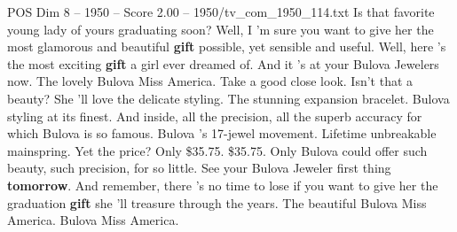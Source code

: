 \begin{textsample}{POS Dim 8 – 1950 – Score 2.00 – 1950/tv\_com\_1950\_114.txt}  \label{ex:f8_pos_016}
Is that favorite young lady of yours graduating soon?
Well, I 'm sure you want to give her the most glamorous and beautiful \textbf{gift} possible, yet sensible and useful.
Well, here 's the most exciting \textbf{gift} a girl ever dreamed of.
And it 's at your Bulova Jewelers now.
The lovely Bulova Miss America.
Take a good close look.
Isn't that a beauty?
She 'll love the delicate styling.
The stunning expansion bracelet.
Bulova styling at its finest.
And inside, all the precision, all the superb accuracy for which Bulova is so famous.
Bulova 's 17-jewel movement.
Lifetime unbreakable mainspring.
Yet the price?
Only \$35.75. \$35.75.
Only Bulova could offer such beauty, such precision, for so little.
See your Bulova Jeweler first thing \textbf{tomorrow}.
And remember, there 's no time to lose if you want to give her the graduation \textbf{gift} she 'll treasure through the years.
The beautiful Bulova Miss America.
Bulova Miss America.

\end{textsample}
